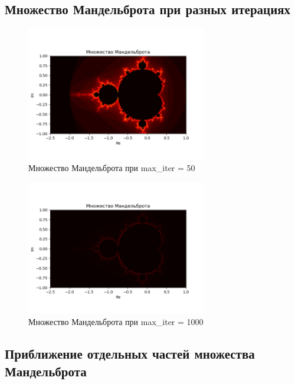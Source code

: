 \documentclass{article}
\begin{document}
	\subsection{Множество Мандельброта при разных итерациях}
	\begin{figure}[H]
		\centering
		\includegraphics[width=0.7\textwidth]{images/mandelbrot_iter50.png}
		\caption{Множество Мандельброта при max\_iter = 50}
		\label{fig:mandelbrot50}
	\end{figure}
	
	\begin{figure}[H]
		\centering
		\includegraphics[width=0.7\textwidth]{images/mandelbrot_iter1000.png}
		\caption{Множество Мандельброта при max\_iter = 1000}
		\label{fig:mandelbrot1000}
	\end{figure}
	
	\subsection{Приближение отдельных частей множества Мандельброта}
	
\end{document}
